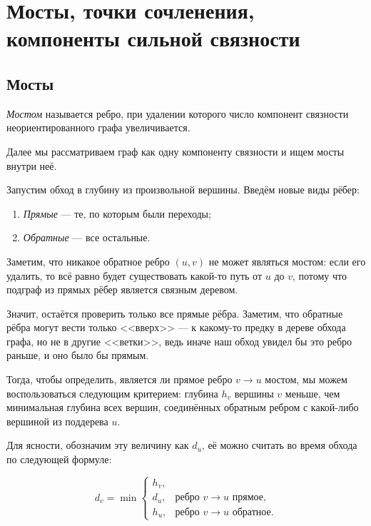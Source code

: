 \section{Мосты, точки сочленения, компоненты сильной связности}

\subsection{Мосты}

\begin{definition}
    \textit{Мостом} называется ребро, при удалении которого число компонент связности неориентированного графа увеличивается.
\end{definition}

Далее мы рассматриваем граф как одну компоненту связности и ищем мосты внутри неё.

Запустим обход в глубину из произвольной вершины. Введём новые виды рёбер:
\begin{enumerate}[nolistsep]
    \item \textit{Прямые} --- те, по которым были переходы;
    \item \textit{Обратные} --- все остальные.
\end{enumerate}

Заметим, что никакое обратное ребро $(u, v)$ не может являться мостом: если его удалить, то всё равно будет существовать какой-то путь от $u$ до $v$, потому что подграф из прямых рёбер является связным деревом.

Значит, остаётся проверить только все прямые рёбра. Заметим, что обратные рёбра могут вести только <<вверх>> --- к какому-то предку в дереве обхода графа, но не в другие <<ветки>>, ведь иначе наш обход увидел бы это ребро раньше, и оно было бы прямым.

Тогда, чтобы определить, является ли прямое ребро $v \to u$ мостом, мы можем воспользоваться следующим критерием: глубина $h_v$ вершины $v$ меньше, чем минимальная глубина всех вершин, соединённых обратным ребром с какой-либо вершиной из поддерева $u$.

Для ясности, обозначим эту величину как $d_u$, её можно считать во время обхода по следующей формуле:

\[
    d_v = \min
    \begin{cases}
        h_v,&\\
        d_u,&\text{ребро $v \to u$ прямое},\\
        h_u,&\text{ребро $v \to u$ обратное}.
    \end{cases}
\]

